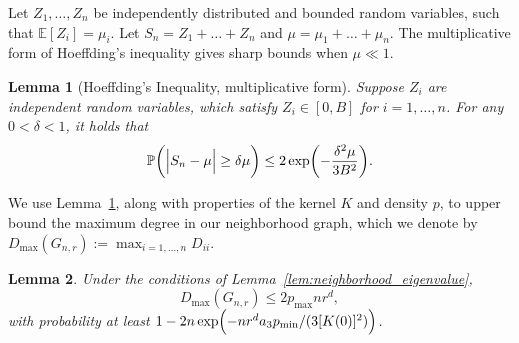 \documentclass[twoside]{article}
\newcommand{\1}{\mathbf{1}}
\newcommand{\Pbb}{\mathbb{P}}
\newcommand{\Ebb}{\mathbb{E}}
\newtheorem{lemma}{Lemma}
\theoremstyle{definition}
\theoremstyle{remark}
\begin{document}
Let $Z_1,\ldots,Z_n$ be independently distributed and bounded random variables, such that $\Ebb[Z_i] = \mu_i$. Let $S_n = Z_1 + \ldots + Z_n$ and $\mu = \mu_1 + \ldots + \mu_n$. The multiplicative form of Hoeffding's inequality gives sharp bounds when $\mu \ll 1$. 
\begin{lemma}[Hoeffding's Inequality, multiplicative form]
	\label{lem:hoeffding}
	Suppose $Z_i$ are independent random variables, which satisfy $Z_i \in [0,B]$ for $i = 1,\ldots,n$. For any $0 < \delta < 1$, it holds that
	\begin{equation*}
	\Pbb\biggl(\Bigl|S_n - \mu\Bigr| \geq \delta \mu\biggr) \leq 2\exp\biggl(-\frac{\delta^2\mu}{3B^2}\biggr).
	\end{equation*}
\end{lemma}
We use Lemma~\ref{lem:hoeffding}, along with properties of the kernel $K$ and density $p$, to upper bound the maximum degree in our neighborhood graph, which we denote by $D_{\max}(G_{n,r}) := \max_{i = 1,\ldots,n} D_{ii}$.
\begin{lemma}
	\label{lem:max_degree}
	Under the conditions of Lemma~\ref{lem:neighborhood_eigenvalue},
	\begin{equation*}
	D_{\max}(G_{n,r}) \leq 2p_{\max}nr^d,
	\end{equation*}
	with probability at least $1 - 2n\exp\Bigl(-nr^da_3p_{\min}/(3[K(0)]^2)\Bigr)$. 
\end{lemma}
\end{document}
